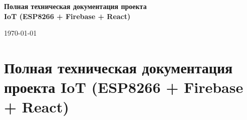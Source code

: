 \documentclass[a4paper,14pt,oneside,openany]{memoir}
\begin{document}
\begin{titlingpage}
    \centering
    \vspace*{0.2\textheight}
    {\Large\bfseries Полная техническая документация проекта\\[0.4em]IoT (ESP8266 + Firebase + React)\par}
    \vfill
    {\large \today\par}
\end{titlingpage}

\chapter*{Полная техническая документация проекта IoT (ESP8266 + Firebase + React)}
\tableofcontents
\clearpage





\end{document}
